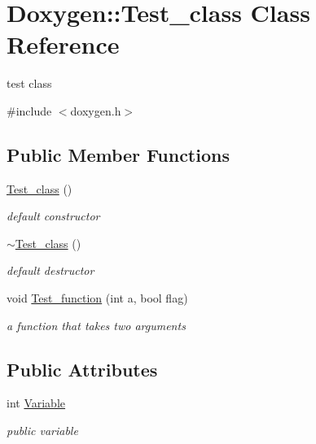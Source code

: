\hypertarget{class_doxygen_1_1_test__class}{}\section{Doxygen\+:\+:Test\+\_\+class Class Reference}
\label{class_doxygen_1_1_test__class}


test class  




{\ttfamily \#include $<$doxygen.\+h$>$}

\subsection*{Public Member Functions}
\begin{DoxyCompactItemize}
\item 
\hypertarget{class_doxygen_1_1_test__class_ad02bf920b94ce72fcfb65e551ea191b9}{}\label{class_doxygen_1_1_test__class_ad02bf920b94ce72fcfb65e551ea191b9} 
\hyperlink{class_doxygen_1_1_test__class_ad02bf920b94ce72fcfb65e551ea191b9}{Test\+\_\+class} ()
\begin{DoxyCompactList}\small\item\em default constructor \end{DoxyCompactList}\item 
\hypertarget{class_doxygen_1_1_test__class_a14bbb2e298940af44038c2025735f38d}{}\label{class_doxygen_1_1_test__class_a14bbb2e298940af44038c2025735f38d} 
\hyperlink{class_doxygen_1_1_test__class_a14bbb2e298940af44038c2025735f38d}{$\sim$\+Test\+\_\+class} ()
\begin{DoxyCompactList}\small\item\em default destructor \end{DoxyCompactList}\item 
void \hyperlink{class_doxygen_1_1_test__class_addda983da64aaea92ea327f1f2db1a9c}{Test\+\_\+function} (int a, bool flag)
\begin{DoxyCompactList}\small\item\em a function that takes two arguments \end{DoxyCompactList}\end{DoxyCompactItemize}
\subsection*{Public Attributes}
\begin{DoxyCompactItemize}
\item 
\hypertarget{class_doxygen_1_1_test__class_a9f2134ed371faa16f21d50012972aa45}{}\label{class_doxygen_1_1_test__class_a9f2134ed371faa16f21d50012972aa45} 
int \hyperlink{class_doxygen_1_1_test__class_a9f2134ed371faa16f21d50012972aa45}{Variable}
\begin{DoxyCompactList}\small\item\em public variable \end{DoxyCompactList}\end{DoxyCompactItemize}


